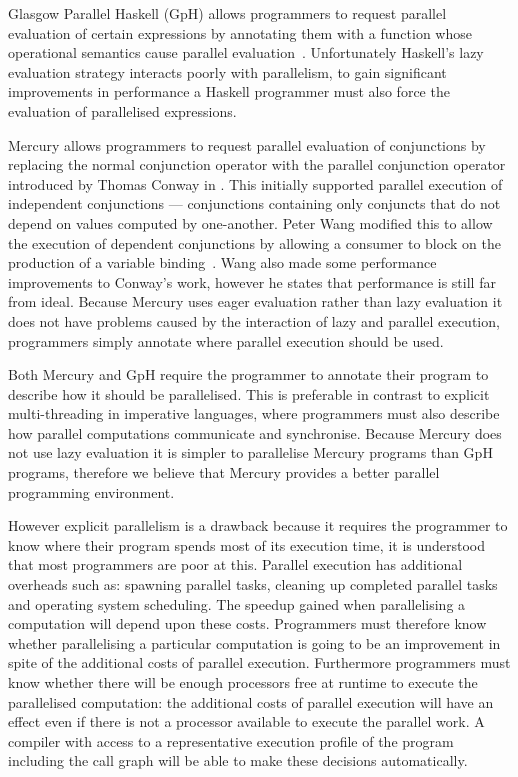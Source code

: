Glasgow Parallel Haskell (GpH) allows programmers to request parallel
evaluation of certain expressions by annotating them with a function
whose operational semantics cause parallel
evaluation~\cite{gph,trinder:1998:strategies,loidi:2008:gph-semiexplicit-parallelism}.
Unfortunately Haskell's lazy evaluation strategy interacts poorly with
parallelism, to gain significant improvements in performance a Haskell
programmer must also force the evaluation of parallelised expressions.

\label{ref:parallel_conjunction}
Mercury allows programmers to request parallel evaluation of
conjunctions by replacing the normal conjunction operator with the
parallel conjunction operator introduced by Thomas Conway in
\cite{conway:parallel-mercury}.
This initially supported parallel execution of independent
conjunctions --- conjunctions containing only conjuncts that do not depend on values
computed by one-another.
Peter Wang modified this to allow the execution of dependent conjunctions by
allowing a consumer to block on the production of a variable
binding~\cite{wang:parallel-mercury}.
Wang also made some performance improvements to Conway's work,
however he states that performance is still far from ideal.
Because Mercury uses eager evaluation rather than lazy evaluation it
does not have problems caused by the interaction of lazy and parallel
execution, programmers simply annotate where parallel execution
should be used.

Both Mercury and GpH require the programmer to annotate their
program to describe how it should be parallelised.
This is preferable in contrast to explicit multi-threading in
imperative languages, where programmers must also describe how
parallel computations communicate and synchronise.
Because Mercury does not use lazy evaluation it is simpler to
parallelise Mercury programs than GpH programs, therefore we believe
that Mercury provides a better parallel programming environment.

However explicit parallelism is a drawback because it requires the
programmer to know where their program spends most of its execution
time, it is understood that most programmers are poor at this.
Parallel execution has additional overheads such as:
spawning parallel tasks,
cleaning up completed parallel tasks and
operating system scheduling.
The speedup gained when parallelising a computation will depend upon
these costs.
Programmers must therefore know whether parallelising a particular
computation is going to be an improvement in spite of the additional
costs of parallel execution.
Furthermore programmers must know whether there will be enough
processors free at runtime to execute the parallelised computation:
the additional costs of parallel execution will have an effect even
if there is not a processor available to execute the parallel work.
A compiler with access to a representative execution profile of the
program including the call graph will be able to make these decisions
automatically.



